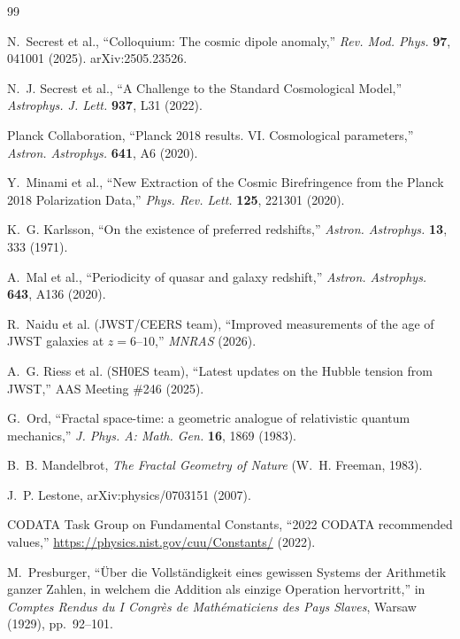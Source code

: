 \documentclass[11pt,a4paper]{article}
\begin{document}
\begin{thebibliography}{99}

N.~Secrest et al., ``Colloquium: The cosmic dipole anomaly,''
\textit{Rev. Mod. Phys.} \textbf{97}, 041001 (2025). arXiv:2505.23526.

N.~J. Secrest et al., ``A Challenge to the Standard Cosmological Model,''
\textit{Astrophys. J. Lett.} \textbf{937}, L31 (2022).

Planck Collaboration, ``Planck 2018 results. VI. Cosmological parameters,''
\textit{Astron. Astrophys.} \textbf{641}, A6 (2020).

Y.~Minami et al., ``New Extraction of the Cosmic Birefringence from the
Planck 2018 Polarization Data,'' \textit{Phys. Rev. Lett.} \textbf{125},
221301 (2020).

K.~G. Karlsson, ``On the existence of preferred redshifts,''
\textit{Astron. Astrophys.} \textbf{13}, 333 (1971).

A.~Mal et al., ``Periodicity of quasar and galaxy redshift,''
\textit{Astron. Astrophys.} \textbf{643}, A136 (2020).

R.~Naidu et al. (JWST/CEERS team), ``Improved measurements of the age of
JWST galaxies at $z=6$--$10$,'' \textit{MNRAS} (2026).

A.~G. Riess et al. (SH0ES team), ``Latest updates on the Hubble tension
from JWST,'' AAS Meeting \#246 (2025).

G.~Ord, ``Fractal space-time: a geometric analogue of relativistic quantum
mechanics,'' \textit{J. Phys. A: Math. Gen.} \textbf{16}, 1869 (1983).

B.~B. Mandelbrot, \textit{The Fractal Geometry of Nature} (W.~H. Freeman,
1983).

J.~P. Lestone, arXiv:physics/0703151 (2007).

CODATA Task Group on Fundamental Constants, ``2022 CODATA recommended
values,'' \url{https://physics.nist.gov/cuu/Constants/} (2022).

M.~Presburger, ``Über die Vollständigkeit eines gewissen Systems der
Arithmetik ganzer Zahlen, in welchem die Addition als einzige Operation
hervortritt,'' in \textit{Comptes Rendus du I Congrès de Mathématiciens des
Pays Slaves}, Warsaw (1929), pp.~92--101.


\end{thebibliography}
\end{document}
